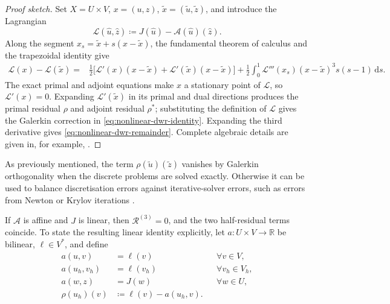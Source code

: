 \begin{proof}[Proof sketch]
Set \(X=U\times V\), \(x=(u,z)\), \(\widetilde x=(\widetilde u,\widetilde z)\), and introduce the Lagrangian
\begin{equation}
  \mathcal L(\widehat u,\widehat z)
  \coloneqq J(\widehat u)-\mathcal A(\widehat u)(\widehat z).
  \label{eq:dwr-lagrangian}
\end{equation}
Along the segment \(x_s=\widetilde x+s(x-\widetilde x)\), the fundamental theorem of calculus and the trapezoidal identity give
\begin{align}
 \mathcal L(x)-\mathcal L(\widetilde x)
 ={}&\frac12\bigl[\mathcal L'(x)(x-\widetilde x)
       +\mathcal L'(\widetilde x)(x-\widetilde x)\bigr] +\frac12\int_0^1
   \mathcal L'''(x_s)(x-\widetilde x)^3s(s-1)\,\mathrm ds.
 \label{eq:dwr-trapezoidal-proof}
\end{align}
The exact primal and adjoint equations make \(x\) a stationary point of \(\mathcal L\), so \(\mathcal L'(x)=0\). Expanding \(\mathcal L'(\widetilde x)\) in its primal and dual directions produces the primal residual \(\rho\) and adjoint residual \(\rho^\ast\); substituting the definition of \(\mathcal L\) gives the Galerkin correction in \eqref{eq:nonlinear-dwr-identity}. Expanding the third derivative gives \eqref{eq:nonlinear-dwr-remainder}. Complete algebraic details are given in, for example, \cite{Rannacher_2013,93,ENDTMAYER202419}.
\end{proof}

As previously mentioned, the term \(\rho(\widetilde u)(\widetilde z)\) vanishes by Galerkin orthogonality when the discrete problems are solved exactly. Otherwise it can be used to balance 
discretisation errors against iterative-solver errors, such as errors from Newton or Krylov iterations \cite{Rannacher_2013}.

If \(\mathcal A\) is affine and \(J\) is linear, then \(\mathcal R^{(3)}=0\), and the two half-residual terms coincide. To state the resulting linear identity explicitly, let \(a:U\times V\rightarrow\mathbb R\) be bilinear, \(\ell\in V^\ast\), and define
\begin{align}
 a(u,v)&=\ell(v) &&\forall v\in V,
 \label{eq:linear-primal}\\
 a(u_h,v_h)&=\ell(v_h) &&\forall v_h\in V_h,
 \label{eq:linear-discrete-primal}\\
 a(w,z)&=J(w) &&\forall w\in U,
 \label{eq:linear-adjoint}\\
 \rho(u_h)(v)&\coloneqq\ell(v)-a(u_h,v).
 \label{eq:linear-residual}
\end{align}

